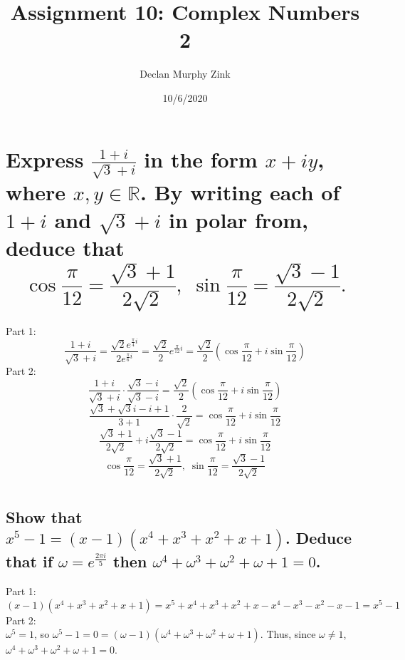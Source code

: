 \documentclass[12pt]{article}
\begin{document}
\title{Assignment 10: Complex Numbers 2}
\author{Declan Murphy Zink}
\date{10/6/2020}
\maketitle

\setcounter{section}{5}

\section{
    Express $\frac{1+i}{\sqrt{3} + i}$ in the form $x + iy$, where $x,y \in \mathds{R}$. 
    By writing each of $1+i$ and $\sqrt{3} + i$ in polar from, deduce that
    $$\cos\frac{\pi}{12} = \frac{\sqrt{3} + 1}{2 \sqrt{2}}, \; \sin\frac{\pi}{12} = \frac{\sqrt{3} - 1}{2 \sqrt{2}}.$$
}
Part 1:
$$\frac{1+i}{\sqrt{3} + i} = \frac{\sqrt{2} e^{\frac{\pi}{4} i}}{2 e^{\frac{\pi}{6} i}} = \frac{\sqrt{2}}{2} e^{\frac{\pi}{12} i} = \frac{\sqrt{2}}{2} (\cos\frac{\pi}{12} + i \sin\frac{\pi}{12})$$
Part 2:
$$\frac{1+i}{\sqrt{3} + i} \cdotp \frac{\sqrt{3} - i}{\sqrt{3} - i} = \frac{\sqrt{2}}{2} (\cos\frac{\pi}{12} + i \sin\frac{\pi}{12})$$
$$\frac{\sqrt{3} + \sqrt{3}i - i + 1}{3 + 1} \cdotp \frac{2}{\sqrt{2}} = \cos\frac{\pi}{12} + i \sin\frac{\pi}{12}$$
$$\frac{\sqrt{3} + 1}{2 \sqrt{2}} + i \frac{\sqrt{3} - 1}{2 \sqrt{2}} = \cos\frac{\pi}{12} + i \sin\frac{\pi}{12}$$
$$\cos\frac{\pi}{12} = \frac{\sqrt{3} + 1}{2 \sqrt{2}}, \; \sin\frac{\pi}{12} = \frac{\sqrt{3} - 1}{2 \sqrt{2}}$$

\section{}
\subsection{
    Show that $x^5 - 1 = (x-1)(x^4 + x^3 + x^2 + x + 1)$. 
    Deduce that if $\omega = e^{\frac{2 \pi i}{5}}$ then $\omega ^4 + \omega ^3 + \omega ^2 + \omega + 1 = 0$.
}
Part 1:
$$(x-1)(x^4 + x^3 + x^2 + x + 1) = x^5 + x^4 + x^3 + x^2 + x - x^4 - x^3 - x^2 - x - 1 = x^5 - 1$$
Part 2:\\
$\omega ^5 = 1$, so $\omega ^5 - 1 = 0 = (\omega - 1)(\omega ^4 + \omega ^3 + \omega ^2 + \omega + 1)$.
Thus, since $\omega \neq 1$, $\omega ^4 + \omega ^3 + \omega ^2 + \omega + 1 = 0$.
\end{document}
